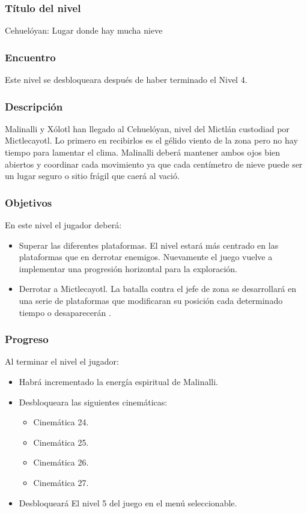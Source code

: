 \documentclass[11pt,letterpaper]{article}
\begin{document}
\begin{itemize}
        \subsubsection{Título del nivel}
        Cehuelóyan: Lugar donde hay mucha nieve
        \subsubsection{Encuentro}
        Este nivel se desbloqueara después de haber terminado el Nivel 4.
        \subsubsection{Descripción}
Malinalli y Xólotl han llegado al Cehuelóyan, nivel del Mictlán custodiad por Mictlecayotl. Lo primero en recibirlos es el gélido viento de la zona pero no hay tiempo para lamentar el clima. Malinalli deberá mantener ambos ojos bien abiertos y coordinar cada movimiento ya que cada centímetro de nieve puede ser un lugar seguro o sitio frágil que caerá al vació.      
        \subsubsection{Objetivos}
En este nivel el jugador deberá:
\begin{itemize}
        \item Superar las diferentes plataformas. El nivel estará más centrado en las plataformas que en derrotar enemigos. Nuevamente el juego vuelve a implementar una progresión horizontal para la exploración. 
        \item  Derrotar a Mictlecayotl. La batalla contra el jefe de zona se desarrollará en una serie de plataformas que modificaran su posición cada determinado tiempo o desaparecerán . 
\end{itemize}


        \subsubsection{Progreso}
        Al terminar el nivel el jugador:
\begin{itemize}
        \item Habrá incrementado la energía espiritual de Malinalli. 
        \item Desbloqueara las siguientes cinemáticas:
\begin{itemize}
        \item Cinemática 24. 
        \item Cinemática 25.
        \item Cinemática 26.
        \item Cinemática 27.
\end{itemize}
        \item Desbloqueará El nivel 5 del juego en el menú seleccionable.
\end{itemize}


\end{itemize}
\end{document}
